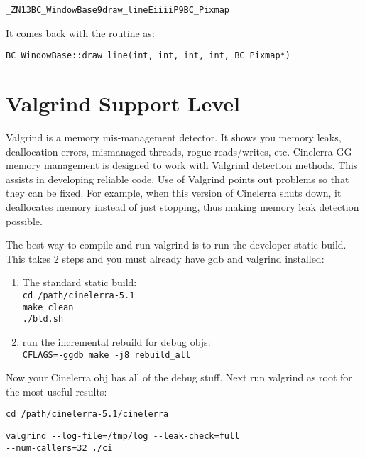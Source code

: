 \hspace{2em}\texttt{\_ZN13BC\_WindowBase9draw\_lineEiiiiP9BC\_Pixmap}

It comes back with the routine as:

\hspace{2em}\texttt{BC\_WindowBase::draw\_line(int, int, int, int, BC\_Pixmap*)}

\section{Valgrind Support Level}
\label{sec:valgrind_support_level}

Valgrind is a memory mis-management detector.  It shows you memory leaks, deallocation errors, mismanaged threads, rogue reads/writes, etc.  Cinelerra-GG memory management is designed to work with Valgrind detection methods.  This assists in developing reliable code.  Use of Valgrind points out problems so that they can be fixed.  For example, when this version of Cinelerra shuts down, it deallocates memory instead of just stopping, thus making memory leak detection possible.

The best way to compile and run valgrind is to run the developer static build. This takes 2 steps and you must already have gdb and valgrind installed:

\begin{enumerate}[nosep]
	\item The standard static build:\\
		\texttt{cd /path/cinelerra-5.1}\\
		\texttt{make clean}\\
		\texttt{./bld.sh}
	\item run the incremental rebuild for debug objs:\\
		\texttt{CFLAGS=-ggdb make -j8 rebuild\_all}
\end{enumerate}

Now your Cinelerra obj has all of the debug stuff. Next run valgrind as root for the most useful results:

\hspace{2em}\texttt{cd /path/cinelerra-5.1/cinelerra}

\hspace{2em}\texttt{valgrind -{}-log-file=/tmp/log -{}-leak-check=full\\
	-{}-num-callers=32 ./ci}


